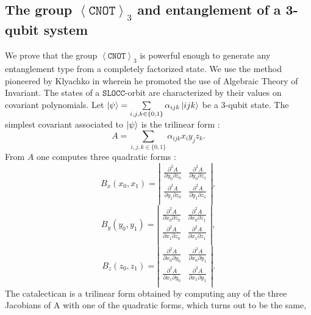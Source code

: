 \documentclass[a4paper,12pt,fleqn]{article}
\newcommand\SLOCC{\mathtt{SLOCC}}
\newcommand\cnot{\mathtt{CNOT}}
\newcommand\XG[1][n]{\left<\cnot\right>_{#1}}
\begin{document}
\subsection{The group $\XG[3]$ and entanglement of a 3-qubit system}
We prove that the  group $\XG[3]$  is powerful enough to generate any entanglement type from a completely factorized state. We use the method pioneered by Klyachko  in \cite{2002Klyachko}  wherein he promoted the use of Algebraic Theory of Invariant. The states of a $\SLOCC$-orbit are characterized by their values on covariant polynomials.
Let $\ket{\psi}=\sum\limits_{i,j,k\in\{0,1\}}\alpha_{ijk}\ket{ijk}$ be a 3-qubit state.
The simplest covariant associated to $\ket{\psi}$ is the trilinear form :
\begin{equation}
  A=\sum\limits_{i,j,k\in\{0,1\}}\alpha_{ijk}x_{i}y_{j}z_{k}.
\end{equation}
From $A$ one computes three quadratic forms :
\begin{equation}
	B_x(x_0,x_1)=\left|\begin{array}{cc}
  \frac{\partial^2A}{\partial y_0\partial z_0}&\frac{\partial^2A}{\partial y_0\partial z_1}\\
  \frac{\partial^2A}{\partial y_1\partial z_0}&\frac{\partial^2A}{\partial y_1\partial z_1}\\
\end{array}\right|,
\end{equation}
\begin{equation}
	B_y(y_0,y_1)=\left|\begin{array}{cc}
  \frac{\partial^2A}{\partial x_0\partial z_0}&\frac{\partial^2A}{\partial x_0\partial z_1}\\
  \frac{\partial^2A}{\partial x_1\partial z_0}&\frac{\partial^2A}{\partial x_1\partial z_1}\\
\end{array}\right|,
\end{equation}
\begin{equation}
	B_z(z_0,z_1)=\left|\begin{array}{cc}
  \frac{\partial^2A}{\partial x_0\partial y_0}&\frac{\partial^2A}{\partial x_0\partial y_1}\\
  \frac{\partial^2A}{\partial x_1\partial y_0}&\frac{\partial^2A}{\partial x_1\partial y_1}\\
\end{array}\right|.
\end{equation}
The catalectican is a trilinear form obtained by computing any of the three Jacobians
of A with one of the quadratic forms, which turns out to be the same, 
\end{document}
